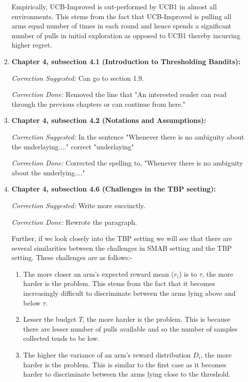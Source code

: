 \documentclass[twoside]{article}
\begin{document}
\begin{enumerate}
    Empirically, UCB-Improved is out-performed by UCB1 in almost all environments. This stems from the fact that UCB-Improved is pulling all arms equal number of times in each round and hence spends a significant number of pulls in initial exploration as opposed to UCB1 thereby incurring higher regret.



\item \textbf{Chapter 4, subsection 4.1 (Introduction to Thresholding Bandits):} 

\textit{Correction Suggested:} Can go to section 1.9.

\textit{Correction Done:} Removed the line that "An interested reader can
read through the previous chapters or can continue from here."


\item \textbf{Chapter 4, subsection 4.2 (Notations and Assumptions):} 

\textit{Correction Suggested:} In the sentence "Whenever there is no ambiguity about the underlaying...." correct "underlaying"

\textit{Correction Done:} Corrected the spelling to, "Whenever there is no ambiguity about the underlying...."


\item \textbf{Chapter 4, subsection 4.6 (Challenges in the TBP seeting):}

\textit{Correction Suggested:} Write more succinctly.

\textit{Correction Done:} Rewrote the paragraph.

Further, if we look closely into the TBP setting we will see that there are several similarities between the challenges in SMAB setting and the TBP setting. These challenges are as follows:-

\begin{enumerate}
\item The more closer an arm’s expected reward mean ($r_i$) is  to $\tau$, the more harder is the problem. This stems from the fact that it becomes increasingly difficult to discriminate between the arms lying above and below $\tau$.
\item Lesser the budget $T$, the more harder is the problem. This is because there are lesser number of pulls available and so the number of samples collected tends to be low.
\item The higher the variance of an arm’s reward distribution $D_i$, the more harder is the problem. This is similar to the first case as it becomes harder to discriminate between the arms lying close to the threshold.
\end{enumerate}



\end{enumerate}
\end{document}
